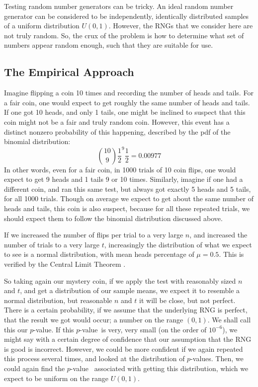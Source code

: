 \newcommand{\pvalue}{$p$-value}

Testing random number generators can be tricky. An ideal random number generator can be considered to be independently, identically distributed samples of a uniform distribution $U(0,1)$. However, the RNGs that we consider here are not truly random. So, the crux of the problem is how to determine what set of numbers appear random enough, such that they are suitable for use.

\subsection{The Empirical Approach}
\label{sec:empirical}

Imagine flipping a coin 10 times and recording the number of heads and tails. For a fair coin, one would expect to get roughly the same number of heads and tails. If one got 10 heads, and only 1 tails, one might be inclined to suspect that this coin might not be a fair and truly random coin. However, this event has a distinct nonzero probability of this happening, described by the pdf of the binomial distribution:
$$ \binom{10}{9} \frac{1}{2}^{9} \frac{1}{2} = 0.00977$$
In other words, even for a fair coin, in 1000 trials of 10 coin flips, one would expect to get 9 heads and 1 tails 9 or 10 times. Similarly, imagine if one had a different coin, and ran this same test, but always got exactly 5 heads and 5 tails, for all 1000 trials. Though on average we expect to get about the same number of heads and tails, this coin is also suspect, because for all these repeated trials, we should expect them to follow the binomial distribution discussed above.

If we increased the number of flips per trial to a very large $n$, and increased the number of trials to a very large $t$, increasingly the distribution of what we expect to see is a normal distribution, with mean heads percentage of $\mu = 0.5$. This is verified by the Central Limit Theorem \cite{central_limit_theorem}.

So taking again our mystery coin, if we apply the test with reasonably sized $n$ and $t$, and get a distribution of our sample means, we expect it to resemble a normal distribution, but reasonable $n$ and $t$ it will be close, but not perfect. There is a certain probability, if we assume that the underlying RNG is perfect, that the result we got would occur; a number on the range $(0,1)$. We shall call this our \pvalue. If this \pvalue~is very, very small (on the order of $10^{-6}$), we might say with a certain degree of confidence that our assumption that the RNG is good is incorrect. However, we could be more confident if we again repeated this process several times, and looked at the distribution of \pvalue s. Then, we could again find the \pvalue~ associated with getting this distribution, which we expect to be uniform on the range $U(0,1)$.


